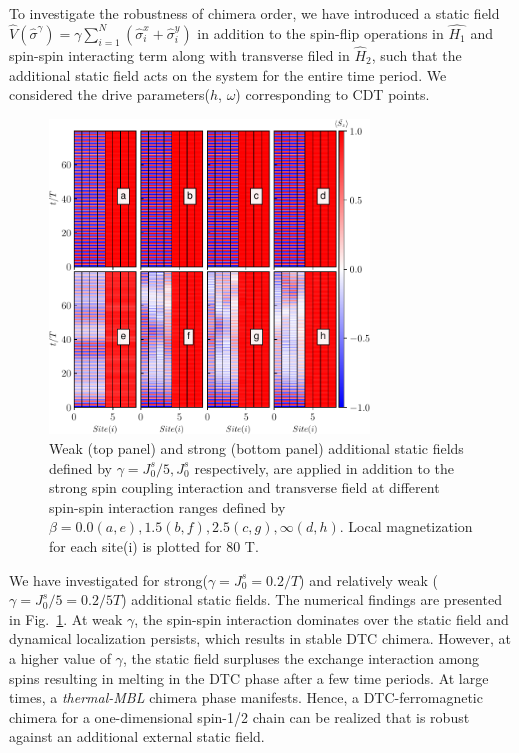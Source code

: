 \documentclass[%
reprint,
superscriptaddress,
amsmath,amssymb,showkeys,
aps,
prb,
]{revtex4-2}
\begin{document}
	To investigate the robustness of chimera order, we have introduced a static field $\displaystyle \hat{V}(\hat{\sigma}^\gamma) =\gamma \sum_{i=1}^{N} (\hat{\sigma}^x_i + \hat{\sigma}^y_i)$ in addition to the spin-flip operations in $\hat{H_1}$ and spin-spin interacting term along with transverse filed in $\hat{H}_2$, such that the additional static field acts on the system for the entire time period. We considered the drive parameters($h$, $\omega$) corresponding to CDT points.
	\begin{figure}
		\begin{center}
			\includegraphics[width=8.5cm]{robustness_N_8.pdf}
		\end{center}
		\caption{Weak (top panel) and strong (bottom panel) additional static fields defined by $\gamma = J_0^s/5, J_0^s$ respectively, are applied in addition to the strong spin coupling interaction and transverse field at different spin-spin interaction ranges defined by $\beta = 0.0 (a,e), 1.5(b,f), 2.5(c,g), \infty(d,h)$. Local magnetization for each site(i) is plotted for 80 T.}
		\label{Fig:robustness}
	\end{figure}
	We have investigated for strong($\displaystyle \gamma= J_0^s=0.2/T$) and relatively weak ($\displaystyle \gamma= J_0^s/5=0.2/5T$) additional static fields. The numerical findings are presented in Fig.~\ref{Fig:robustness}. At weak $\gamma$, the spin-spin interaction dominates over the static field and dynamical localization persists, which results in stable DTC chimera. However, at a higher value of $\gamma$, the static field surpluses the exchange interaction among spins resulting in melting in  the DTC phase after a few time periods. At large times, a \textit{thermal-MBL} chimera phase manifests. Hence, a DTC-ferromagnetic chimera for a one-dimensional spin-1/2 chain can be realized that is robust against an additional external static field.	
	
\end{document}
